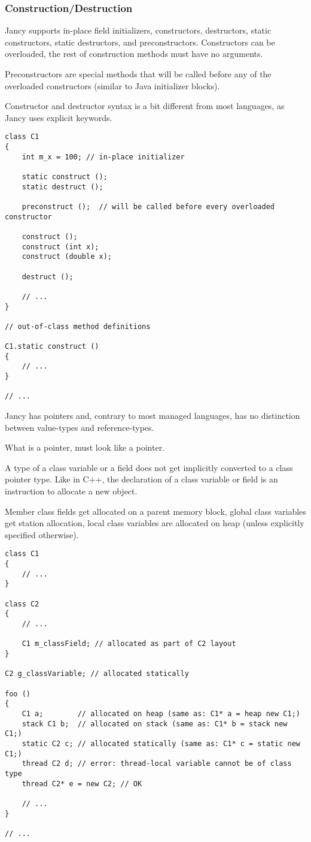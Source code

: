 \documentclass[oneside]{book}
\begin{document}
\subsubsection{Construction/Destruction}

Jancy supports in-place field initializers, constructors, destructors, static constructors, static destructors, and preconstructors. Constructors can be overloaded, the rest of construction methods must have no arguments.

Preconstructors are special methods that will be called before any of the overloaded constructors (similar to Java initializer blocks).

Constructor and destructor syntax is a bit different from most languages, as Jancy uses explicit keywords.

\begin{lstlisting}
class C1 
{
    int m_x = 100; // in-place initializer

    static construct ();
    static destruct ();

    preconstruct ();  // will be called before every overloaded constructor

    construct ();
    construct (int x);
    construct (double x);

    destruct ();

    // ...
}

// out-of-class method definitions

C1.static construct ()
{
    // ...
}

// ...
\end{lstlisting}

Jancy has pointers and, contrary to most managed languages, has no distinction between value-types and reference-types.

What is a pointer, must look like a pointer.

A type of a class variable or a field does not get implicitly converted to a class pointer type. Like in C++, the declaration of a class variable or field is an instruction to allocate a new object.

Member class fields get allocated on a parent memory block, global class variables get station allocation, local class variables are allocated on heap (unless explicitly specified otherwise).

\begin{lstlisting}
class C1 
{
    // ...
}

class C2
{
    // ...

    C1 m_classField; // allocated as part of C2 layout
}

C2 g_classVariable; // allocated statically

foo ()
{
    C1 a;        // allocated on heap (same as: C1* a = heap new C1;)
    stack C1 b;  // allocated on stack (same as: C1* b = stack new C1;)
    static C2 c; // allocated statically (same as: C1* c = static new C1;)
    thread C2 d; // error: thread-local variable cannot be of class type
    thread C2* e = new C2; // OK

    // ...
}

// ...
\end{lstlisting}
\end{document}
